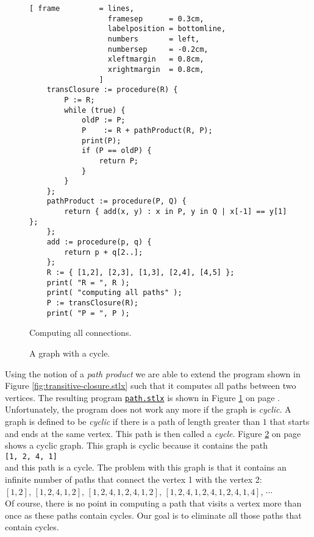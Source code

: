 \begin{figure}[!ht]
  \centering
\begin{Verbatim}[ frame         = lines, 
                  framesep      = 0.3cm, 
                  labelposition = bottomline,
                  numbers       = left,
                  numbersep     = -0.2cm,
                  xleftmargin   = 0.8cm,
                  xrightmargin  = 0.8cm,
                ]
    transClosure := procedure(R) {
        P := R;
        while (true) {
            oldP := P;
            P    := R + pathProduct(R, P);
            print(P);
            if (P == oldP) {
                return P;
            }
        }
    };
    pathProduct := procedure(P, Q) {
        return { add(x, y) : x in P, y in Q | x[-1] == y[1] };
    };    
    add := procedure(p, q) {
        return p + q[2..];
    };
    R := { [1,2], [2,3], [1,3], [2,4], [4,5] };
    print( "R = ", R );
    print( "computing all paths" );
    P := transClosure(R);
    print( "P = ", P );
\end{Verbatim} 
\vspace*{-0.3cm}
\caption{Computing all connections.}  \label{fig:path.stlx}
\end{figure} %

\begin{figure}[!ht]
  \centering
  \vspace*{-9cm}

  \vspace*{-1cm}

  \caption{A graph with a cycle.}
  \label{fig:graph-zykl}
\end{figure}

Using the notion of a \emph{path product} we are able to extend the program shown in Figure
\ref{fig:transitive-closure.stlx} such that it computes all paths between two vertices.
The resulting program
\href{https://github.com/karlstroetmann/Logik/blob/master/SetlX/path.stlx}{\texttt{path.stlx}}
is shown in Figure \ref{fig:path.stlx} on page \pageref{fig:path.stlx}.
Unfortunately, the program does not work any more if the graph is \emph{cyclic}.  A graph is defined
to be \emph{cyclic} if there is a path of length greater than $1$ that starts and ends at the same
vertex.  This path is then called a \colorbox{amethyst}{\emph{cycle}}.
Figure \ref{fig:graph-zykl} on page \pageref{fig:graph-zykl} shows a cyclic graph.  This graph is
cyclic because it contains the path
\\[0.2cm]
\hspace*{1.3cm}
\texttt{[1, 2, 4, 1]}
\\[0.2cm]
and this path is a cycle.
The problem with this graph is that it contains an infinite number of paths that connect the vertex
1 with the vertex 2: \\[0.2cm]
\hspace*{1.3cm}
$[ 1, 2 ]$, $[ 1, 2, 4, 1, 2 ]$, 
$[ 1, 2, 4, 1, 2, 4, 1, 2 ]$, 
$[ 1, 2, 4, 1, 2, 4, 1, 2, 4, 1, 4 ]$, $\cdots$
\\[0.2cm]
Of course, there is no point in computing a path that visits a vertex more than once as these paths
contain cycles.  Our goal is to eliminate all those paths that contain cycles.


